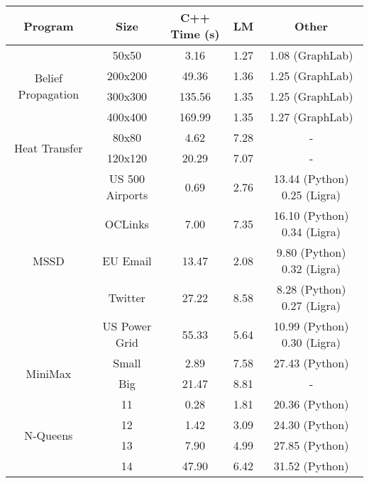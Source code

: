 \begin{tabular}{c | c || c | c | c} \hline
	\textbf{Program} & \textbf{Size} & \textbf{C++ Time} (s) & \textbf{LM} & \textbf{Other} \\ \hline \hline
	\multirow{4}{*}{Belief Propagation}  & 50x50 &  3.16  &  1.27  &  1.08 (GraphLab) \\
		 & 200x200 &  49.36  &  1.36  &  1.25 (GraphLab) \\
		 & 300x300 &  135.56  &  1.35  &  1.25 (GraphLab) \\
		 & 400x400 &  169.99  &  1.35  &  1.27 (GraphLab) \\
	\hline
	\multirow{2}{*}{Heat Transfer}  & 80x80 &  4.62  &  7.28  &  - \\
		 & 120x120 &  20.29  &  7.07  &  - \\
	\hline
	\multirow{5}{*}{MSSD}  & US 500 Airports &  0.69  &  2.76  &  13.44 (Python) 0.25 (Ligra) \\
		 & OCLinks &  7.00  &  7.35  &  16.10 (Python) 0.34 (Ligra) \\
		 & EU Email &  13.47  &  2.08  &  9.80 (Python) 0.32 (Ligra) \\
		 & Twitter &  27.22  &  8.58  &  8.28 (Python) 0.27 (Ligra) \\
		 & US Power Grid &  55.33  &  5.64  &  10.99 (Python) 0.30 (Ligra) \\
	\hline
	\multirow{2}{*}{MiniMax}  & Small &  2.89  &  7.58  &  27.43 (Python) \\
		 & Big &  21.47  &  8.81  &  - \\
	\hline
	\multirow{4}{*}{N-Queens}  & 11 &  0.28  &  1.81  &  20.36 (Python) \\
		 & 12 &  1.42  &  3.09  &  24.30 (Python) \\
		 & 13 &  7.90  &  4.99  &  27.85 (Python) \\
		 & 14 &  47.90  &  6.42  &  31.52 (Python) \\
	\hline
\end{tabular}
